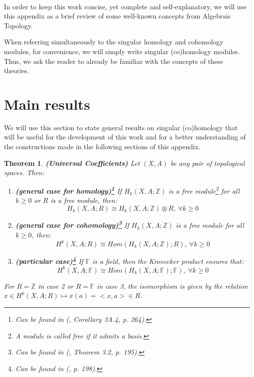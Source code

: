 \documentclass[12pt,oneside]{book}
\newtheorem{teo}    {Theorem}[chapter]
\newcommand{\Z}{\mathbb{Z}}
\newcommand{\F}{\mathbb{F}}
\newcommand{\tensor}{\otimes}
\begin{document}
    \

    In order to keep this work concise, yet complete and self-explanatory, we will use this appendix as 
    a brief review of some well-known concepts from Algebraic Topology.

    When referring simultaneously to the singular homology and cohomology modules, for convenience, we 
    will simply write singular (co)homology modules. Thus, we ask the 
    reader to already be familiar with the concepts of these theories.
    
    \section{Main results}\label{ap_principais_res}
    
    We will use this section to state general results on singular (co)homology that will be useful for 
    the development of this work and for a better understanding of the constructions made in the 
    following sections of this appendix.
    
    \begin{teo}{\bf (Universal Coefficients)}
        Let $(X,A)$ be any pair of topological spaces. Then:
        \begin{enumerate}
            \item \textbf{(general case for homology)\footnote{Can be found in (\cite{hatcher}, 
            Corollary 3A.4, p. 264).}} If $H_{k}(X,A;\Z)$ is a free 
            module\footnote{A module is called free if it admits a basis.} for 
            all $k\geq 0$ or $R$ is a free module, then:
            $$ H_{k}(X,A;R)\cong H_{k}(X,A;\Z)\tensor R, \ \forall k\geq 0 $$
            \item \textbf{(general case for cohomology)\footnote{Can be found in (\cite{hatcher}, 
            Theorem 3.2, p. 195).}} If $H_{k}(X,A;\Z)$ is a free module for all $k\geq 0$, then:
            $$ H^{k}(X,A;R)\cong Hom(H_{k}(X,A;\Z);R), \ \forall k\geq 0 $$
            \item \textbf{(particular case)\footnote{Can be found in (\cite{hatcher}, p. 198).}} 
            If $\mathbb{F}$ is a field, then the Kronecker product ensures that:
            $$ H^{k}(X,A;\F)\cong Hom(H_{k}(X,A;\F);\F), \ \forall k\geq 0 $$
        \end{enumerate}
        For $R=\Z$ in case 2 or $R=\F$ in case 3, the isomorphism is given by the relation 
        $x\in H^{k}(X,A;R)\mapsto\overline{x}(a)=<x,a>\in R$.
    \end{teo}
    
\end{document}
